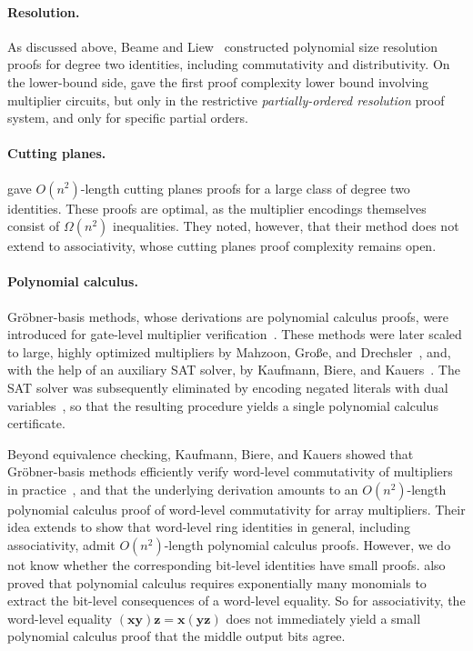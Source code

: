 \documentclass[11pt]{article}
\theoremstyle{definition}
\theoremstyle{remark}
\newcommand{\vv}[1]{\mathbf{#1}}
\begin{document}
\paragraph{Resolution.}
As discussed above, Beame and Liew~\cite{beame-liew} constructed
polynomial size resolution proofs for degree two identities, including commutativity and distributivity. On the lower-bound side, \cite{proofdoor} gave the first proof complexity lower bound involving
multiplier circuits, but only in the restrictive \emph{partially-ordered
resolution} proof system, and only for specific partial orders.

\paragraph{Cutting planes.}
\cite{lbden} gave
$O(n^2)$-length cutting planes proofs for a large class of degree two
identities. These proofs are optimal, as the multiplier encodings themselves consist of $\Omega(n^2)$ inequalities. They noted, however, that their method does not extend to
associativity, whose cutting planes proof complexity remains open.

\paragraph{Polynomial calculus.}
Gr\"obner-basis methods, whose derivations are polynomial calculus proofs, were
introduced for gate-level multiplier verification~\cite{sayed-ahmed,rbk}. These methods were later scaled to large, highly optimized
multipliers by Mahzoon, Gro\ss{}e, and
Drechsler~\cite{revsca}, and, with the help of an auxiliary SAT solver, by Kaufmann, Biere, and Kauers~\cite{kbk-fmcad}. The SAT solver was subsequently eliminated by encoding negated literals with dual
variables~\cite{kbbn}, so that the resulting procedure yields a
single polynomial calculus certificate.

Beyond equivalence checking, Kaufmann, Biere, and Kauers showed that Gr\"obner-basis methods
efficiently verify word-level commutativity of multipliers in practice~\cite{kbk}, and that
the underlying derivation amounts to an $O(n^2)$-length polynomial calculus
proof of word-level commutativity for array multipliers. Their idea extends to show that
word-level ring identities in general, including associativity, admit
$O(n^2)$-length polynomial calculus proofs. However, we do not know whether the corresponding bit-level identities have small proofs. \cite{lbden} also proved that polynomial calculus requires exponentially many monomials to extract the bit-level consequences of a
word-level equality. So for associativity, the word-level equality $(\vv{x}\vv{y})\vv{z} = \vv{x}(\vv{y}\vv{z})$ does not immediately yield a small polynomial calculus proof that the middle output bits agree.
\end{document}
